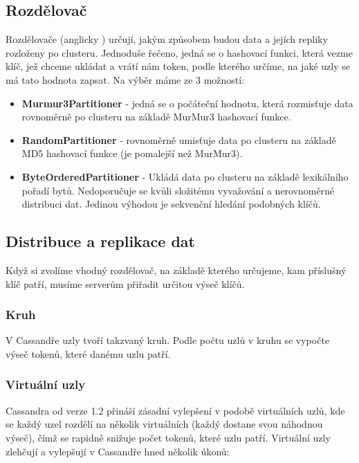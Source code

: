 \subsection{Rozdělovač}
Rozdělovače (anglicky ) určují, jakým způsobem budou data a jejích repliky rozloženy po clusteru. Jednoduše řečeno, jedná se o hashovací funkci, která vezme klíč, jež chceme ukládat a vrátí nám token, podle kterého určíme, na jaké uzly se má tato hodnota zapsat. Na výběr máme ze 3 možností:

\begin{itemize}
\item \textbf{Murmur3Partitioner} - jedná se o počáteční hodnotu, která rozmisťuje data rovnoměrně po clusteru na základě MurMur3 hashovací funkce.
\item \textbf{RandomPartitioner} - rovnoměrně umisťuje data po clusteru na základě MD5 hashovací funkce (je pomalejší než MurMur3).
\item \textbf{ByteOrderedPartitioner} -  Ukládá data po clusteru na základě lexikálního pořadí bytů. Nedoporučuje se kvůli složitému vyvažování a nerovnoměrné distribuci dat. Jedinou výhodou je sekvenční hledání podobných klíčů.
\end{itemize}

\subsection{Distribuce a replikace dat}
Když si zvolíme vhodný rozdělovač, na základě kterého určujeme, kam příslušný klíč patří, musíme serverům přiřadit určitou výseč klíčů. 

\subsubsection{Kruh}
V Cassandře uzly tvoří takzvaný kruh. Podle počtu uzlů v kruhu se vypočte výseč tokenů, které danému uzlu patří. 

\subsubsection{Virtuální uzly}
Cassandra od verze 1.2 přináší zásadní vylepšení v podobě virtuálních uzlů, kde se každý uzel rozdělí na několik virtuálních (každý dostane svou náhodnou výseč), čímž se rapidně snižuje počet tokenů, které uzlu patří. Virtuální uzly zlehčují a vylepšují v Cassandře hned několik úkonů:

